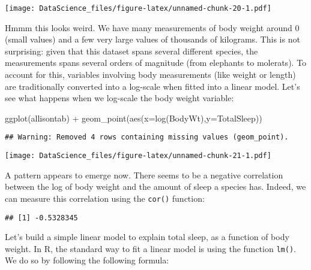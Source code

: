 \documentclass[
]{book}
\newenvironment{Shaded}{\begin{snugshade}}{\end{snugshade}}
\newcommand{\AttributeTok}[1]{\textcolor[rgb]{0.77,0.63,0.00}{#1}}
\newcommand{\FunctionTok}[1]{\textcolor[rgb]{0.00,0.00,0.00}{#1}}
\newcommand{\NormalTok}[1]{#1}
\newcommand{\SpecialCharTok}[1]{\textcolor[rgb]{0.00,0.00,0.00}{#1}}
\newcommand{\StringTok}[1]{\textcolor[rgb]{0.31,0.60,0.02}{#1}}
\begin{document}
\texttt{[image: DataScience\_files/figure-latex/unnamed-chunk-20-1.pdf]}

Hmmm this looks weird. We have many measurements of body weight around 0 (small values) and a few very large values of thousands of kilograms. This is not surprising: given that this dataset spans several different species, the measurements spans several orders of magnitude (from elephants to molerats). To account for this, variables involving body measurements (like weight or length) are traditionally converted into a log-scale when fitted into a linear model. Let's see what happens when we log-scale the body weight variable:

\begin{Shaded}
\begin{Highlighting}[]
\FunctionTok{ggplot}\NormalTok{(allisontab) }\SpecialCharTok{+} \FunctionTok{geom\_point}\NormalTok{(}\FunctionTok{aes}\NormalTok{(}\AttributeTok{x=}\FunctionTok{log}\NormalTok{(BodyWt),}\AttributeTok{y=}\NormalTok{TotalSleep))}
\end{Highlighting}
\end{Shaded}

\begin{verbatim}
## Warning: Removed 4 rows containing missing values (geom_point).
\end{verbatim}

\texttt{[image: DataScience\_files/figure-latex/unnamed-chunk-21-1.pdf]}

A pattern appears to emerge now. There seems to be a negative correlation between the log of body weight and the amount of sleep a species has. Indeed, we can measure this correlation using the \texttt{cor()} function:

\begin{Shaded}
\end{Shaded}

\begin{verbatim}
## [1] -0.5328345
\end{verbatim}

Let's build a simple linear model to explain total sleep, as a function of body weight. In R, the standard way to fit a linear model is using the function \texttt{lm()}. We do so by following the following formula:
\end{document}

